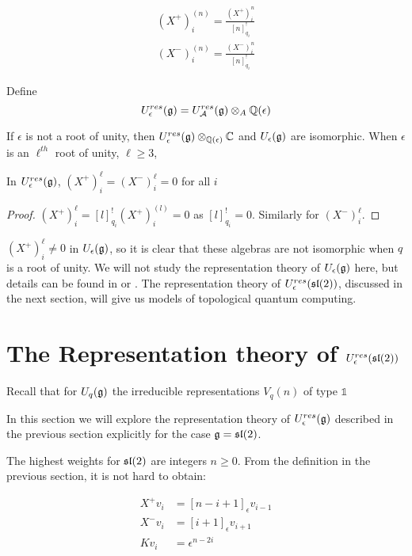 \begin{align}
     (X^+)_i^{(n)} = \frac{ (X^+)_i^n}{[n]^!_{q_i}} \\
    (X^-)_i^{(n)} = \frac{(X^-)_i^n}{[n]^!_{q_i}} 
\end{align}


Define 
\begin{equation}
    U_\epsilon^{res}(\mathfrak{g}) = U_\mathcal{A}^{res}(\mathfrak{g}) \otimes_A \mathbb{Q}(\epsilon)
\end{equation}

If $\epsilon$ is not a root of unity, then $U_\epsilon^{res}(\mathfrak{g})
\otimes_{\mathbb{Q}(\epsilon)} \mathbb{C}$ and $U_\epsilon(\mathfrak{g})$ are
isomorphic. When $\epsilon$ is an $\ell^{th}$ root of unity, $\ell \geq 3$,

\begin{lemma}
    In $U_\epsilon^{res}(\mathfrak{g})$, $ (X^+)_i^\ell = (X^-)_i^\ell = 0$ for all $i$
\end{lemma}
\begin{proof}
    $ (X^+)_i^\ell = [l]_{q_i}^!  (X^+)_i^{(l)} = 0$ as $[l]_{q_i}^! = 0$. Similarly for $(X^-)_i^\ell$.
\end{proof}

$(X^+)_i^\ell \neq 0$ in $U_\epsilon(\mathfrak{g})$, so it is clear that these algebras
are not isomorphic when $q$ is a root of unity. We will not study the
representation theory of $U_\epsilon(\mathfrak{g})$ here, but details can be found in
\cite{Kassel1994} or \cite{Jantzen1995}. The representation theory of
$U_\epsilon^{res}(\mathfrak{sl}(2))$, discussed in the next section, will give us models
of topological quantum computing. 

\section{The Representation theory of $U_\epsilon^{res}(\mathfrak{sl}(2))$}
\label{RepTheoryofResSL2}

Recall that for $U_q(\mathfrak{g})$ the irreducible representations $V_q(n)$ of type $\mathbb{1}$

In this section we will explore the representation theory of
$U_\epsilon^{res}(\mathfrak{g})$ described in the previous section explicitly for the
case $\mathfrak{g} = \mathfrak{sl}(2)$.

The highest weights for $\mathfrak{sl}(2)$ are integers $n \geq 0$. From the definition
in the previous section, it is not hard to obtain:

\begin{align}
     X^+ v_i &= [n-i+1]_\epsilon v_{i-1} \\
    X^-v_i &= [i+1]_\epsilon v_{i+1} \\
    Kv_i &= \epsilon^{n-2i}
\end{align}

